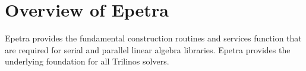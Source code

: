 % 
% 
% 
%  
%  
% 

\section{Overview of Epetra}

Epetra provides the fundamental construction
routines and services function that are required for serial and
parallel linear algebra libraries.  Epetra provides the underlying
foundation for all Trilinos solvers.

